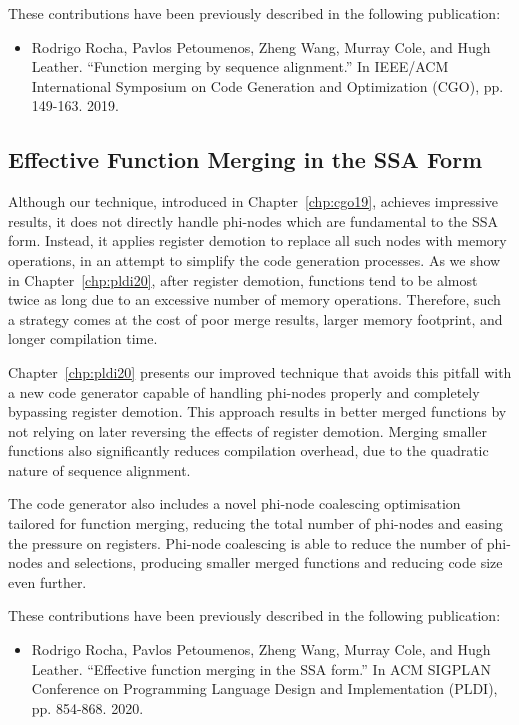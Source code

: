 These contributions have been previously described in the following publication:
\begin{itemize}
\item Rodrigo Rocha, Pavlos Petoumenos, Zheng Wang, Murray Cole, and Hugh Leather. ``Function merging by sequence alignment.'' In IEEE/ACM International Symposium on Code Generation and Optimization (CGO), pp. 149-163. 2019.
\end{itemize}

\subsection{Effective Function Merging in the SSA Form}


Although our technique, introduced in Chapter~\ref{chp:cgo19}, achieves impressive results, it does not directly handle phi-nodes which are fundamental to the SSA form.
Instead, it applies register demotion to replace all such nodes with memory operations, in an attempt to simplify the code generation processes.
As we show in Chapter~\ref{chp:pldi20}, after register demotion, functions tend to be almost twice as long due to an excessive number of memory operations.
Therefore, such a strategy comes at the cost of poor merge results, larger memory footprint, and longer compilation time.

Chapter~\ref{chp:pldi20} presents our improved technique that avoids this pitfall with a new code generator capable of handling phi-nodes properly and completely bypassing register demotion.
This approach results in better merged functions by not relying on later reversing the effects of register demotion.
Merging smaller functions also significantly reduces compilation overhead, due to the quadratic nature of sequence alignment.

The code generator also includes a novel phi-node coalescing optimisation tailored for function merging, reducing the total number of phi-nodes and easing the pressure on registers.
Phi-node coalescing is able to reduce the number of phi-nodes and selections, producing smaller merged functions and reducing code size even further.

These contributions have been previously described in the following publication:
\begin{itemize}
\item Rodrigo Rocha, Pavlos Petoumenos, Zheng Wang, Murray Cole, and Hugh Leather. ``Effective function merging in the SSA form.'' In ACM SIGPLAN Conference on Programming Language Design and Implementation (PLDI), pp. 854-868. 2020.
\end{itemize}

